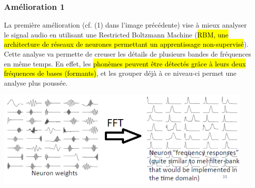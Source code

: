 \documentclass[letterpaper, 12pt]{article}
\newcommand{\alinea}{
\hspace*{0.5cm}}
\begin{document}
			\subsubsection{Amélioration 1}
				\alinea La première amélioration (cf. (1) dans l'image précédente) vise à mieux analyser le signal audio en utilisant 
					une Restricted Boltzmann Machine (\hl{RBM,
					une architecture de réseaux de neurones permettant un apprentissage non-supervisé}). Cette analyse va permette
					de creuser les détails de plusieurs bandes de fréquences en même temps. En effet, les \hl{phonèmes peuvent être
					détectés grâce à leurs deux fréquences de bases (formants)}, et les grouper déjà à ce niveau-ci permet une 
					analyse plus poussée.
				\begin{center}
					\includegraphics[width=5in]{Images/rbm}
				\end{center}
\end{document}
